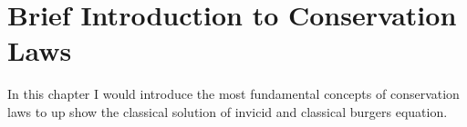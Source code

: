 %

\chapter{Brief Introduction to Conservation Laws}
In this chapter I would introduce the most fundamental concepts of conservation laws to up show the classical solution of invicid and classical burgers equation.

%
